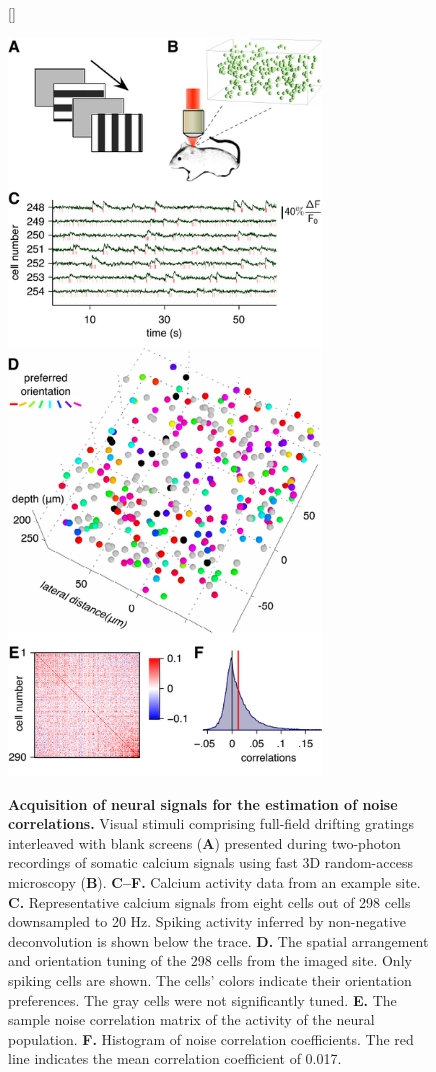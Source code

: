 \documentclass[10pt]{article}
\begin{document}
\begin{figure}    [\FBwidth]
    {\caption{{\bf Acquisition of neural signals for the estimation of noise correlations.}
    Visual stimuli comprising full-field drifting gratings interleaved with blank screens ({\bf A}) presented during two-photon recordings of somatic calcium signals using fast 3D random-access microscopy ({\bf B}). 
    {\bf C--F.} Calcium activity data from an example site.
    {\bf C.} Representative calcium signals from eight cells out of 298 cells downsampled to 20 Hz. Spiking activity inferred by non-negative deconvolution is shown below the trace.
    {\bf D.} The spatial arrangement and orientation tuning of the 298 cells from the imaged site. Only spiking cells are shown. The cells' colors indicate their orientation preferences. The gray cells were not significantly tuned.
    {\bf E.} The sample noise correlation matrix of the activity of the neural population. 
    {\bf F.} Histogram of noise correlation coefficients. The red line indicates the mean correlation coefficient of 0.017.
} \label{fig:2}}
    {\includegraphics[width=8.3cm]{figures/Figure02.pdf}}
\end{figure}
\end{document}
